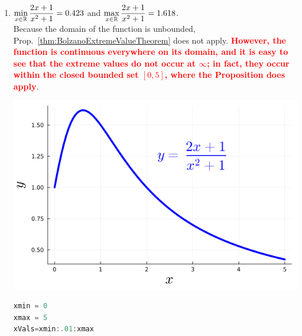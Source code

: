 \begin{enumerate}
\begin{lstlisting}[language=Julia,style=mystyle]
f(x) = exp(-x^2)*sin(x)

y = f.(xVals)

p1 = plot(xVals,y, linewidth=4, color=:blue, label=false)
plot!(xlabel=L"$x$", ylabel=L"$y=e^{-x^2} ~ \sin(x)$") 

@show MaxF = maximum(y)
@show MinF = minimum(y)

max_value, index = findmax(y)
println("Maximum value: ", max_value)
println("x^*: ", xVals[index] )

min_value, index = findmin(y)
println("Minimum value: ", min_value,)
println("x_*: ", xVals[index] )

display(p1)

png(p1, "MaxMinC")
\end{lstlisting}
\textbf{Output} 
\begin{verbatim}
MaxF = maximum(y) = 0.3966429553529812
MinF = minimum(y) = -0.3966429553529812
Maximum value: 0.3966429553529812
x^*: 0.65
Minimum value: -0.3966429553529812
x_*: -0.65
\end{verbatim}



    
    

    \item  \Ans $\displaystyle \min_{x \in \mathbb R} \frac{2x + 1}{x^2 + 1} = 0.423$ and  $\displaystyle \max_{x \in \mathbb R} \frac{2x + 1}{x^2 + 1} = 1.618$.\\  
    
    Because the domain of the function is unbounded, Prop.~\ref{thm:BolzanoExtremeValueTheorem} does not apply. \textcolor{red}{\bf However, the function is continuous everywhere on its domain, and it is easy to see that the extreme values do not occur at $\infty$; in fact, they occur within the closed bounded set $[0, 5]$, where the Proposition does apply}. 

    \begin{center}
    \includegraphics[width=0.45\columnwidth]{graphics/Chap04/MaxMinD.png}
    \end{center}
    
\begin{lstlisting}[language=Julia,style=mystyle]
xmin = 0
xmax = 5
xVals=xmin:.01:xmax


\end{lstlisting}
\end{enumerate}
